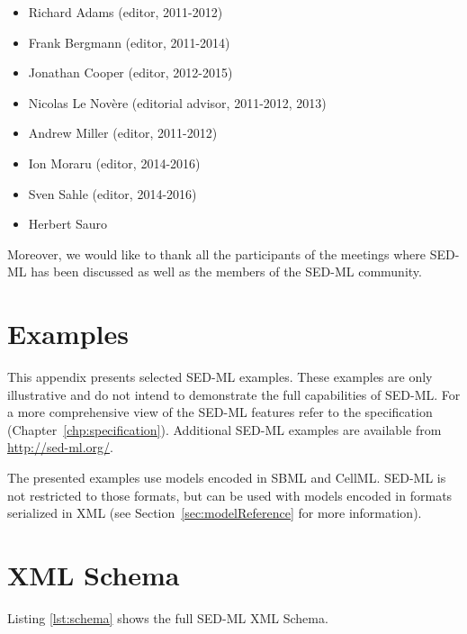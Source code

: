 \documentclass[pdftex,rgb,dvipsnames,svgnames,hyperref,table]{report}
\begin{document}
\begin{itemize}
\item Richard Adams (editor, 2011-2012)
\item Frank Bergmann (editor, 2011-2014)
\item Jonathan Cooper (editor, 2012-2015)
\item Nicolas Le Novère (editorial advisor, 2011-2012, 2013)
\item Andrew Miller (editor, 2011-2012)
\item Ion Moraru (editor, 2014-2016)
\item Sven Sahle (editor, 2014-2016)
\item Herbert Sauro
\end{itemize}

Moreover, we would like to thank all the participants of the meetings where SED-ML has been discussed as well as the members of the SED-ML community.


\appendix

\chapter{Examples}
\label{app:examples}
This appendix presents selected SED-ML examples. These examples are only illustrative and do not intend to demonstrate the full capabilities of SED-ML. For a more comprehensive view of the SED-ML features refer to the specification (Chapter~\ref{chp:specification}). Additional SED-ML examples are available from \url{http://sed-ml.org/}.

The presented examples use models encoded in SBML and CellML. SED-ML is not restricted to those formats, but can be used with models encoded in formats serialized in XML (see Section~\ref{sec:modelReference} for more information).




\chapter{XML Schema}
\label{app:schema}
Listing \ref{lst:schema} shows the full SED-ML XML Schema.



\end{document}
